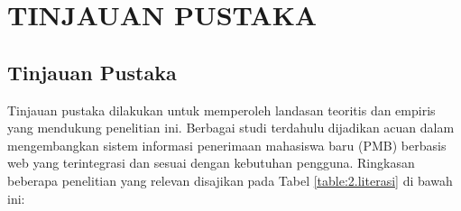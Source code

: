 \newpage
\chapter{TINJAUAN PUSTAKA} \label{Bab II}

\section{Tinjauan Pustaka} \label{II.Tinjauan}
Tinjauan pustaka dilakukan untuk memperoleh landasan teoritis dan empiris yang mendukung penelitian ini. Berbagai studi terdahulu dijadikan acuan dalam mengembangkan sistem informasi penerimaan mahasiswa baru (PMB) berbasis web yang terintegrasi dan sesuai dengan kebutuhan pengguna. Ringkasan beberapa penelitian yang relevan disajikan pada Tabel \ref{table:2.literasi} di bawah ini:\par

